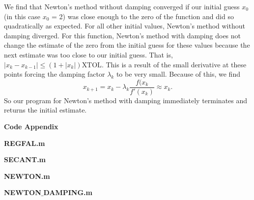 \documentclass[final,12pt,reqno]{amsart}
\newcommand\abs[1]{\left|#1\right|}
\begin{document}
We find that Newton's method without damping converged if our initial guess $x_0$ (in this case $x_0$ = 2) was close enough to the zero of the function and did so quadratically as expected. For all other initial values, Newton's method without damping diverged. For this function, Newton's method with damping does not change the estimate of the zero from the initial guess for these values because the next estimate was too close to our initial guess. That is, $\abs{x_k - x_{k-1}} \leq (1 + \abs{x_k})\text{XTOL}$. This is a result of the small derivative at these points forcing the damping factor $\lambda_k$ to be very small. Because of this, we find
\[
	x_{k+1} = x_k - \lambda_k\frac{f(x_k}{f'(x_k)} \approx x_k.
\]
So our program for Newton's method with damping immediately terminates and returns the initial estimate.

\newpage

\textbf{Code Appendix}


\textbf{REGFAL.m}


\newpage


\textbf{SECANT.m}


\newpage


\textbf{NEWTON.m}


\newpage


\textbf{NEWTON$\_$DAMPING.m}

\end{document}
